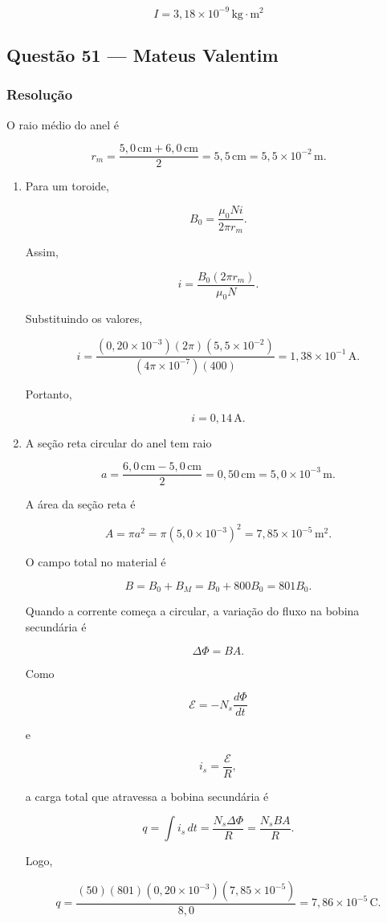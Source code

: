 \documentclass[12pt,a4paper]{article}
\begin{document}
\[
\boxed{I = 3,18 \times 10^{-9}\,\text{kg}\cdot\text{m}^2}
\]

\subsection{Questão 51 — Mateus Valentim}
\subsubsection{Resolução}

O raio médio do anel é

\[
r_m=\frac{5{,}0\,\text{cm}+6{,}0\,\text{cm}}{2}
=5{,}5\,\text{cm}
=5{,}5\times 10^{-2}\,\text{m}.
\]

\begin{enumerate}
    \item[(a)] Para um toroide,

    \[
    B_0=\frac{\mu_0Ni}{2\pi r_m}.
    \]

    Assim,

    \[
    i=\frac{B_0(2\pi r_m)}{\mu_0N}.
    \]

    Substituindo os valores,

    \[
    i=
    \frac{(0{,}20\times 10^{-3})(2\pi)(5{,}5\times 10^{-2})}
    {(4\pi\times 10^{-7})(400)}
    =
    1{,}38\times 10^{-1}\,\text{A}.
    \]

    Portanto,

    \[
    i=0{,}14\,\text{A}.
    \]

    \item[(b)] A seção reta circular do anel tem raio

    \[
    a=\frac{6{,}0\,\text{cm}-5{,}0\,\text{cm}}{2}
    =0{,}50\,\text{cm}
    =5{,}0\times 10^{-3}\,\text{m}.
    \]

    A área da seção reta é

    \[
    A=\pi a^2
    =\pi(5{,}0\times 10^{-3})^2
    =7{,}85\times 10^{-5}\,\text{m}^2.
    \]

    O campo total no material é

    \[
    B=B_0+B_M=B_0+800B_0=801B_0.
    \]

    Quando a corrente começa a circular, a variação do fluxo na bobina
    secundária é

    \[
    \Delta \Phi=B A.
    \]

    Como

    \[
    \mathcal{E}=-N_s\frac{d\Phi}{dt}
    \]

    e

    \[
    i_s=\frac{\mathcal{E}}{R},
    \]

    a carga total que atravessa a bobina secundária é

    \[
    q=\int i_s\,dt
    =
    \frac{N_s\Delta\Phi}{R}
    =
    \frac{N_sBA}{R}.
    \]

    Logo,

    \[
    q=
    \frac{(50)(801)(0{,}20\times 10^{-3})(7{,}85\times 10^{-5})}{8{,}0}
    =
    7{,}86\times 10^{-5}\,\text{C}.
    \]
\end{enumerate}
\end{document}
